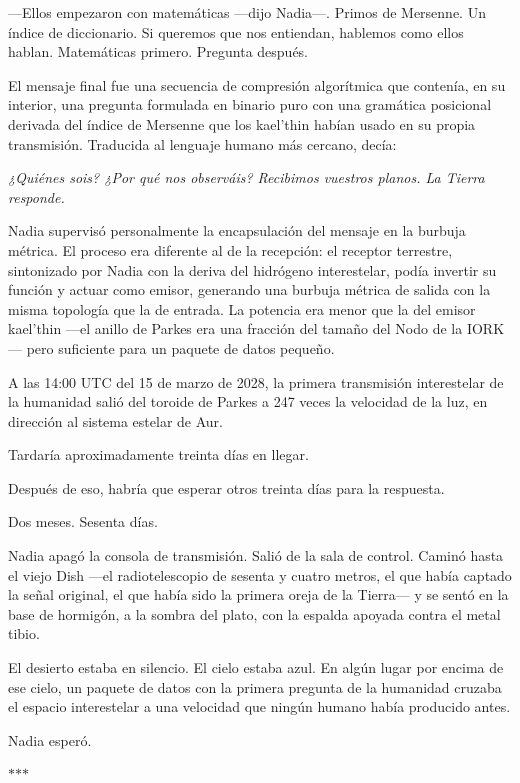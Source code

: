 \documentclass[11pt,a5paper,twoside]{book}
\begin{document}
—Ellos empezaron con matemáticas —dijo Nadia—. Primos de Mersenne. Un índice de diccionario. Si queremos que nos entiendan, hablemos como ellos hablan. Matemáticas primero. Pregunta después.

El mensaje final fue una secuencia de compresión algorítmica que contenía, en su interior, una pregunta formulada en binario puro con una gramática posicional derivada del índice de Mersenne que los kael'thin habían usado en su propia transmisión. Traducida al lenguaje humano más cercano, decía:

\textit{¿Quiénes sois? ¿Por qué nos observáis? Recibimos vuestros planos. La Tierra responde.}

Nadia supervisó personalmente la encapsulación del mensaje en la burbuja métrica. El proceso era diferente al de la recepción: el receptor terrestre, sintonizado por Nadia con la deriva del hidrógeno interestelar, podía invertir su función y actuar como emisor, generando una burbuja métrica de salida con la misma topología que la de entrada. La potencia era menor que la del emisor kael'thin —el anillo de Parkes era una fracción del tamaño del Nodo de la IORK— pero suficiente para un paquete de datos pequeño.

A las 14:00 UTC del 15 de marzo de 2028, la primera transmisión interestelar de la humanidad salió del toroide de Parkes a 247 veces la velocidad de la luz, en dirección al sistema estelar de Aur.

Tardaría aproximadamente treinta días en llegar.

Después de eso, habría que esperar otros treinta días para la respuesta.

Dos meses. Sesenta días.

Nadia apagó la consola de transmisión. Salió de la sala de control. Caminó hasta el viejo Dish —el radiotelescopio de sesenta y cuatro metros, el que había captado la señal original, el que había sido la primera oreja de la Tierra— y se sentó en la base de hormigón, a la sombra del plato, con la espalda apoyada contra el metal tibio.

El desierto estaba en silencio. El cielo estaba azul. En algún lugar por encima de ese cielo, un paquete de datos con la primera pregunta de la humanidad cruzaba el espacio interestelar a una velocidad que ningún humano había producido antes.

Nadia esperó.

\vspace{1.5em}
\begin{center}$\ast$\quad$\ast$\quad$\ast$\end{center}
\vspace{1.5em}
\end{document}
